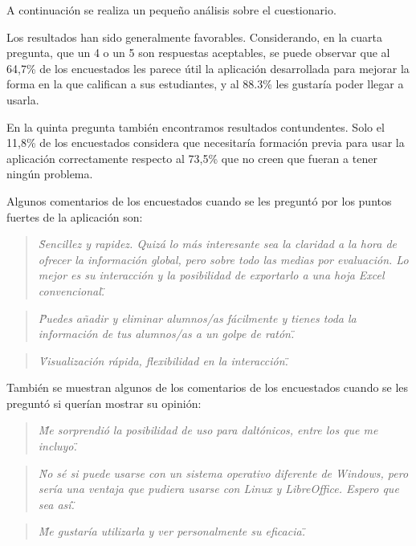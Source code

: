A continuación se realiza un pequeño análisis sobre el cuestionario.

Los resultados han sido generalmente favorables. Considerando, en la cuarta pregunta, que un 4 o un 5 son respuestas aceptables, se puede observar que al 64,7\% de los encuestados les parece útil la aplicación desarrollada para mejorar la forma en la que califican a sus estudiantes, y al 88.3\% les gustaría poder llegar a usarla.

En la quinta pregunta también encontramos resultados contundentes. Solo el 11,8\% de los encuestados considera que necesitaría formación previa para usar la aplicación correctamente respecto al 73,5\% que no creen que fueran a tener ningún problema.

Algunos comentarios de los encuestados cuando se les preguntó por los puntos fuertes de la aplicación son:
\begin{quote}
\textit{\"Sencillez y rapidez. Quizá lo más interesante sea la claridad a la hora de ofrecer la información global, pero sobre todo las medias por evaluación. Lo mejor es su interacción y la posibilidad de exportarlo a una hoja Excel convencional.\"}
\end{quote}

\begin{quote}
\textit{\"Puedes añadir y eliminar alumnos/as fácilmente y tienes toda la información de tus alumnos/as a un golpe de ratón.\"}
\end{quote}

\begin{quote}
\textit{\"Visualización rápida, flexibilidad en la interacción.\"}
\end{quote}

También se muestran algunos de los comentarios de los encuestados cuando se les preguntó si querían mostrar su opinión:
\begin{quote}
\textit{\"Me sorprendió la posibilidad de uso para daltónicos, entre los que me incluyo.\"}
\end{quote}

\begin{quote}
\textit{\"No sé si puede usarse con un sistema operativo diferente de Windows, pero sería una ventaja que pudiera usarse con Linux y LibreOffice. Espero que sea así.\"}
\end{quote}

\begin{quote}
\textit{\"Me gustaría utilizarla y ver personalmente su eficacia.\"}
\end{quote}

